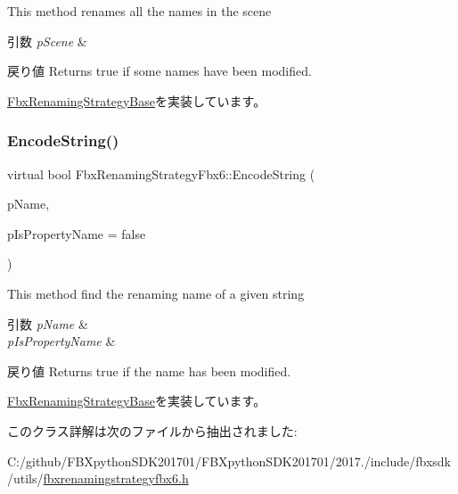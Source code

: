 This method renames all the names in the scene 
\begin{DoxyParams}{引数}
{\em p\+Scene} & \\
\hline
\end{DoxyParams}
\begin{DoxyReturn}{戻り値}
Returns true if some names have been modified. 
\end{DoxyReturn}


\hyperlink{class_fbx_renaming_strategy_base_a7449fa6c649949d6d5e3c4b7190d6b25}{Fbx\+Renaming\+Strategy\+Base}を実装しています。

\mbox{\label{class_fbx_renaming_strategy_fbx6_aee897659c210920eefbcb899b8b463d6}} 
\subsubsection{\texorpdfstring{Encode\+String()}{EncodeString()}}
{\footnotesize\ttfamily virtual bool Fbx\+Renaming\+Strategy\+Fbx6\+::\+Encode\+String (\begin{DoxyParamCaption}\item[{\hyperlink{class_fbx_name_handler}{Fbx\+Name\+Handler} \&}]{p\+Name,  }\item[{bool}]{p\+Is\+Property\+Name = {\ttfamily false} }\end{DoxyParamCaption})\hspace{0.3cm}{\ttfamily [virtual]}}

This method find the renaming name of a given string 
\begin{DoxyParams}{引数}
{\em p\+Name} & \\
\hline
{\em p\+Is\+Property\+Name} & \\
\hline
\end{DoxyParams}
\begin{DoxyReturn}{戻り値}
Returns true if the name has been modified. 
\end{DoxyReturn}


\hyperlink{class_fbx_renaming_strategy_base_aa762726a9d92a328ec720f2b8135db09}{Fbx\+Renaming\+Strategy\+Base}を実装しています。



このクラス詳解は次のファイルから抽出されました\+:\begin{DoxyCompactItemize}
\item 
C\+:/github/\+F\+B\+Xpython\+S\+D\+K201701/\+F\+B\+Xpython\+S\+D\+K201701/2017./include/fbxsdk/utils/\hyperlink{fbxrenamingstrategyfbx6_8h}{fbxrenamingstrategyfbx6.\+h}\end{DoxyCompactItemize}
